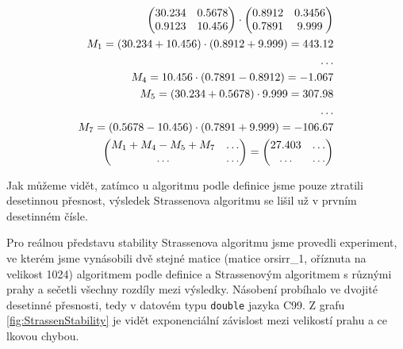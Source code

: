 \begin{align}
\begin{pmatrix}
 30.234 & 0.5678 \\
 0.9123 & 10.456
\end{pmatrix} \cdot \begin{pmatrix}
 0.8912 & 0.3456 \\
 0.7891 & 9.999
\end{pmatrix} \notag\\
M_{1} = (30.234 + 10.456) \cdot (0.8912 + 9.999) = 443.12  \notag\\
\hdots \notag\\
M_{4} = 10.456 \cdot (0.7891 - 0.8912) = -1.067 \notag\\
M_{5} = (30.234 + 0.5678) \cdot 9.999 = 307.98 \notag\\
\hdots \notag\\
M_{7} = (0.5678 - 10.456) \cdot (0.7891 + 9.999) = -106.67 \notag\\
 \begin{pmatrix}
 M_{1} + M_{4} - M_{5} + M_{7} & \hdots \\
 \hdots & \hdots
\end{pmatrix} = \begin{pmatrix}
 27.403 & \hdots \\
 \hdots & \hdots
\end{pmatrix} \notag
\end{align}


Jak můžeme vidět, zatímco u algoritmu podle definice jsme pouze ztratili desetinnou přesnost, výsledek Strassenova algoritmu se lišil už v prvním desetinném čísle. 

Pro reálnou představu stability Strassenova algoritmu jsme provedli experiment, ve kterém jsme vynásobili dvě stejné matice (matice orsirr\_1, oříznuta na velikost 1024) algoritmem podle definice a Strassenovým algoritmem s různými prahy a sečetli všechny rozdíly mezi výsledky. Násobení probíhalo ve dvojité desetinné přesnosti, tedy v datovém typu \texttt{double} jazyka C99. Z grafu \ref{fig:StrassenStability} je vidět exponenciální závislost mezi velikostí prahu a ce	lkovou chybou.

